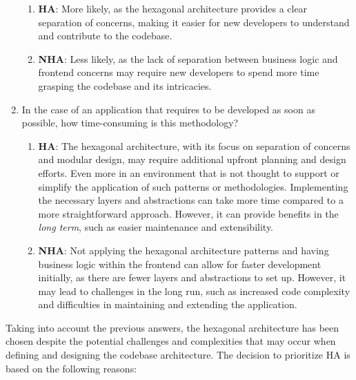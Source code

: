 \documentclass[../design.tex]{subfiles}
\begin{document}
\begin{enumerate}
	      \begin{enumerate}[label=-]
		      \item \textbf{HA}: More likely, as the hexagonal architecture provides a
		            clear separation of concerns, making it easier for new developers to
		            understand and contribute to the codebase.
		      \item \textbf{NHA}: Less likely, as the lack of separation between
		            business logic and frontend concerns may require new developers to
		            spend more time grasping the codebase and its intricacies.
	      \end{enumerate}
	\item In the case of an application that requires to be developed as soon as
	      possible, how time-consuming is this methodology?
	      \begin{enumerate}[label=-]
		      \item \textbf{HA}: The hexagonal architecture, with its focus on
		            separation of concerns and modular design, may require
		            additional upfront planning and design efforts. Even more in an
		            environment that is not thought to support or simplify the
		            application of such patterns or methodologies. Implementing the
		            necessary layers and abstractions can take more time compared to
		            a more straightforward approach. However, it can provide
		            benefits in the \emph{long term}, such as easier maintenance and
		            extensibility.
		      \item \textbf{NHA}: Not applying the hexagonal architecture patterns and
		            having business logic within the frontend can allow for faster
		            development initially, as there are fewer layers and abstractions to
		            set up. However, it may lead to challenges in the long run, such as
		            increased code complexity and difficulties in maintaining and
		            extending the application.
	      \end{enumerate}
\end{enumerate}
Taking into account the previous answers, the hexagonal architecture has been
chosen despite the potential challenges and complexities that may occur when
defining and designing the codebase architecture. The decision to prioritize HA
is based on the following reasons:
\end{document}
